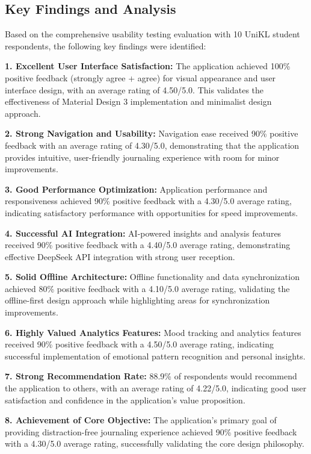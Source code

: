 \subsection{Key Findings and Analysis}\label{sec:keyFindings}

Based on the comprehensive usability testing evaluation with 10 UniKL student respondents, the following key findings were identified:

\textbf{1. Excellent User Interface Satisfaction:} The application achieved 100\% positive feedback (strongly agree + agree) for visual appearance and user interface design, with an average rating of 4.50/5.0. This validates the effectiveness of Material Design 3 implementation and minimalist design approach.

\textbf{2. Strong Navigation and Usability:} Navigation ease received 90\% positive feedback with an average rating of 4.30/5.0, demonstrating that the application provides intuitive, user-friendly journaling experience with room for minor improvements.

\textbf{3. Good Performance Optimization:} Application performance and responsiveness achieved 90\% positive feedback with a 4.30/5.0 average rating, indicating satisfactory performance with opportunities for speed improvements.

\textbf{4. Successful AI Integration:} AI-powered insights and analysis features received 90\% positive feedback with a 4.40/5.0 average rating, demonstrating effective DeepSeek API integration with strong user reception.

\textbf{5. Solid Offline Architecture:} Offline functionality and data synchronization achieved 80\% positive feedback with a 4.10/5.0 average rating, validating the offline-first design approach while highlighting areas for synchronization improvements.

\textbf{6. Highly Valued Analytics Features:} Mood tracking and analytics features received 90\% positive feedback with a 4.50/5.0 average rating, indicating successful implementation of emotional pattern recognition and personal insights.

\textbf{7. Strong Recommendation Rate:} 88.9\% of respondents would recommend the application to others, with an average rating of 4.22/5.0, indicating good user satisfaction and confidence in the application's value proposition.

\textbf{8. Achievement of Core Objective:} The application's primary goal of providing distraction-free journaling experience achieved 90\% positive feedback with a 4.30/5.0 average rating, successfully validating the core design philosophy.

